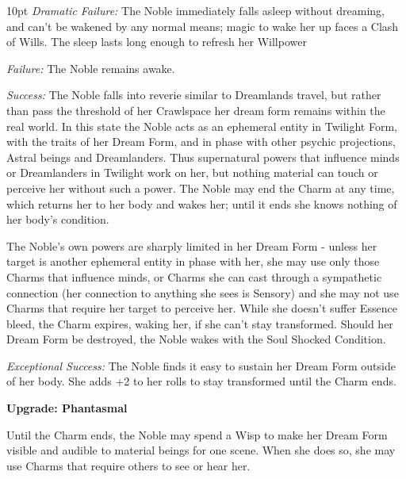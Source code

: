\begin{myindentpar}{10pt} \emph{Dramatic Failure:} The Noble immediately falls asleep without dreaming, and can’t be wakened by any normal means; magic to wake her up faces a Clash of Wills. The sleep lasts long enough to refresh her Willpower

    \emph{Failure:} The Noble remains awake.

    \emph{Success:} The Noble falls into reverie similar to Dreamlands travel, but rather than pass the threshold of her Crawlspace her dream form remains within the real world. In this state the Noble acts as an ephemeral entity in Twilight Form, with the traits of her Dream Form, and in phase with other psychic projections, Astral beings and Dreamlanders. Thus supernatural powers that influence minds or Dreamlanders in Twilight work on her, but nothing material can touch or perceive her without such a power. The Noble may end the Charm at any time, which returns her to her body and wakes her; until it ends she knows nothing of her body’s condition.
	
	The Noble’s own powers are sharply limited in her Dream Form - unless her target is another ephemeral entity in phase with her, she may use only those Charms that influence minds, or Charms she can cast through a sympathetic connection (her connection to anything she sees is Sensory) and she may not use Charms that require her target to perceive her. While she doesn’t suffer Essence bleed, the Charm expires, waking her, if she can’t stay transformed. Should her Dream Form be destroyed, the Noble wakes with the Soul Shocked Condition.

    \emph{Exceptional Success:}  The Noble finds it easy to sustain her Dream Form outside of her body. She adds +2 to her rolls to stay transformed until the Charm ends.
	
	\textbf{Upgrade: Phantasmal}

    Until the Charm ends, the Noble may spend a Wisp to make her Dream Form visible and audible to material beings for one scene. When she does so, she may use Charms that require others to see or hear her.
	
	\end{myindentpar}